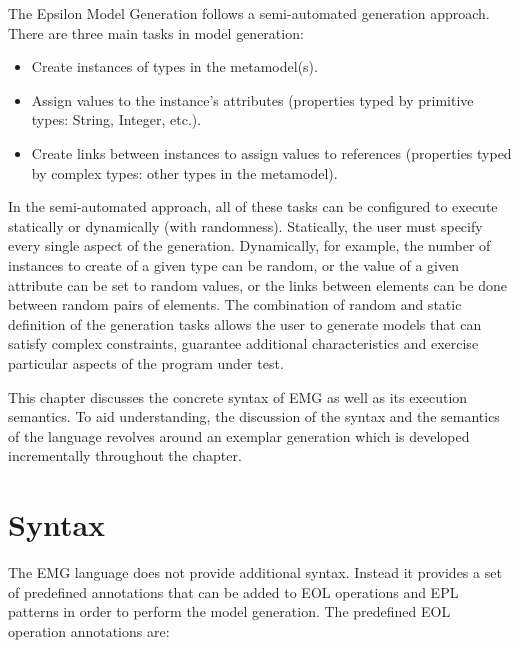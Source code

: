 The Epsilon Model Generation follows a semi-automated generation approach. There are three main tasks in model generation:
\begin{itemize}
    \item Create instances of types in the metamodel(s).
    \item Assign values to the instance's attributes (properties typed by primitive types: String, Integer, etc.).
    \item Create links between instances to assign values to references (properties typed by complex types: other types in the metamodel). 
\end{itemize}

In the semi-automated approach, all of these tasks can be configured to execute statically or dynamically (with randomness). Statically, the user must specify every single aspect of the generation. Dynamically, for example, the number of instances to create of a given type can be random, or the value of a given attribute can be set to random values, or the links between elements can be done between random pairs of elements. The combination of random and static definition of the generation tasks allows the user to generate models that can satisfy complex constraints, guarantee additional characteristics and exercise particular aspects of the program under test.  

This chapter discusses the concrete syntax of EMG as well as its execution semantics. To aid understanding, the discussion of the syntax and the semantics of the language revolves around an exemplar generation which is developed incrementally throughout the chapter. 

\section{Syntax}

The EMG language does not provide additional syntax. Instead it provides a set of predefined annotations that can be added to EOL operations and EPL patterns in order to perform the model generation. The predefined EOL operation annotations are:

